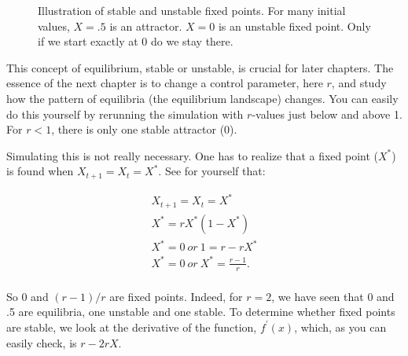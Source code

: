 \documentclass[
  a4paper,
  DIV=11,
  numbers=noendperiod,
  oneside]{scrreprt}
\begin{document}
\begin{figure}


\caption{\label{fig-ch2-img3}Illustration of stable and unstable fixed
points. For many initial values, \(X = .5\) is an attractor. \(X = 0\)
is an unstable fixed point. Only if we start exactly at 0 do we stay
there.}

\end{figure}%

This concept of equilibrium, stable or unstable, is crucial for later
chapters. The essence of the next chapter is to change a control
parameter, here \(r\), and study how the pattern of equilibria (the
equilibrium landscape) changes. You can easily do this yourself by
rerunning the simulation with \(r\)-values just below and above 1. For
\(r < 1\), there is only one stable attractor (0).

Simulating this is not really necessary. One has to realize that a fixed
point (\(X^{*}\)) is found when \(X_{t + 1} = X_{t} = X^{*}\). See for
yourself that:

\[
\begin{gathered}
X_{t + 1} = X_{t} = X^{*} \\
X^{*} = rX^{*}( 1 - X^{*}) \\
X^{*} = 0\ or\ 1 = r - rX^{*} \\
X^{*} = 0\ or\ X^{*} = \frac{r - 1}{r}. \\
\end{gathered}
\]

So 0 and \((r - 1)/r\) are fixed points. Indeed, for \(r = 2\), we have
seen that 0 and .5 are equilibria, one unstable and one stable. To
determine whether fixed points are stable, we look at the derivative of
the function, \(f^{'}(x)\), which, as you can easily check, is
\(r - 2rX\).
\end{document}
